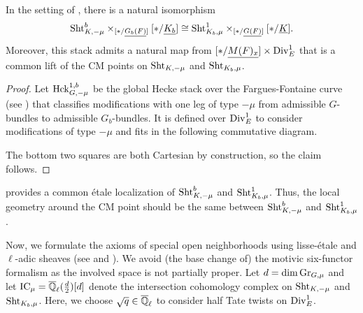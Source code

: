 \documentclass[12pt,reqno]{amsart}
\begin{document}
\begin{lem} \label{lem:sht_comparison}
    In the setting of , there is a natural isomorphism
    \[
        {\operatorname{Sht}}_{K, -\mu}^b \times_{[\ast / {\underline{G_b(F)}}]} [\ast / {\underline{K_b}}] \cong {\operatorname{Sht}}_{K_b, \mu}^1 \times_{[\ast / {\underline{G(F)}}]} [\ast / {\underline{K}}]. 
    \]
    Moreover, this stack admits a natural map from $[\ast / {\underline{M(F)_x}}] \times {\operatorname{Div}}^1_E$ that is a common lift of the CM points on ${\operatorname{Sht}}_{K, -\mu}$ and ${\operatorname{Sht}}_{K_b, \mu}$. 
\end{lem}
\begin{proof}
    Let ${\operatorname{Hck}}_{G, -\mu}^{1, b}$ be the global Hecke stack over the Fargues-Fontaine curve (see \cite[Chapter IX]{FS24}) that classifies modifications with one leg of type $-\mu$ from admissible $G$-bundles to admissible $G_b$-bundles. It is defined over ${\operatorname{Div}}^1_E$ to consider modifications of type $-\mu$ and fits in the following commutative diagram. 
    \begin{center}
    \end{center}
    The bottom two squares are both Cartesian by construction, so the claim follows. 
\end{proof}

 provides a common \'{e}tale localization of ${\operatorname{Sht}}_{K, -\mu}^b$ and ${\operatorname{Sht}}_{K_{b}, \mu}^1$. Thus, the local geometry around the CM point should be the same between ${\operatorname{Sht}}_{K, -\mu}^b$ and ${\operatorname{Sht}}_{K_{b}, \mu}^1$. %

Now, we formulate the axioms of special open neighborhoods using lisse-\'{e}tale and $\ell$-adic sheaves (see \cite[{}VII.6]{FS24} and \cite[Section 26]{Sch17}). We avoid (the base change of) the motivic six-functor formalism \cite{Sch26} as the involved space is not partially proper. Let $d = \dim {\operatorname{Gr}}_{G, \mu}$ and let ${\operatorname{IC}}_\mu = {\overline{\mathbb{Q}}_\ell}(\tfrac{d}{2})[d]$ denote the intersection cohomology complex on ${\operatorname{Sht}}_{K, -\mu}$ and ${\operatorname{Sht}}_{K_{b}, \mu}$. Here, we choose $\sqrt{q} \in {\overline{\mathbb{Q}}_\ell}$ to consider half Tate twists on ${\operatorname{Div}}^1_E$. 
\end{document}
